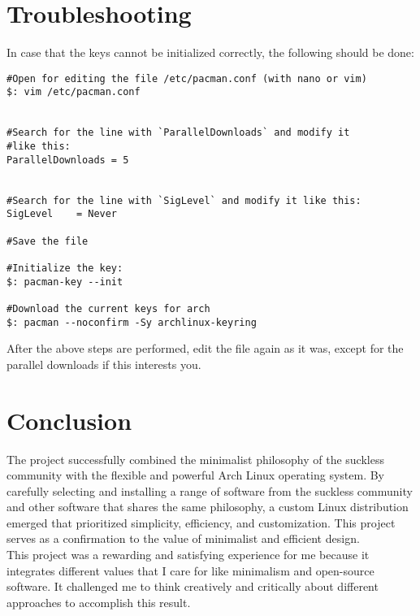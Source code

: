 \documentclass{article}
\begin{document}
\section{Troubleshooting}

In case that the keys cannot be initialized correctly, the following should be done:
\lstset{language=bash}
\begin{lstlisting}
#Open for editing the file /etc/pacman.conf (with nano or vim)
$: vim /etc/pacman.conf


#Search for the line with `ParallelDownloads` and modify it 
#like this:
ParallelDownloads = 5


#Search for the line with `SigLevel` and modify it like this:
SigLevel	= Never

#Save the file

#Initialize the key:
$: pacman-key --init

#Download the current keys for arch
$: pacman --noconfirm -Sy archlinux-keyring
\end{lstlisting}

\noindent After the above steps are performed, edit the file again as it was, except for the parallel downloads
if this interests you.

\clearpage
\section{Conclusion}
The project successfully combined the minimalist philosophy of the suckless community with the flexible and powerful Arch Linux operating system. By carefully selecting and installing a range of software from the suckless community and other software that shares the same philosophy, a custom Linux distribution emerged that prioritized simplicity, efficiency, and customization. This project serves as a confirmation to the value of minimalist and efficient design.\\
\newline
This project was a rewarding and satisfying experience for me because it\\
integrates different values that I care for like minimalism and open-source\\
software. It challenged me to think creatively and critically about different approaches to accomplish this result.
\end{document}
